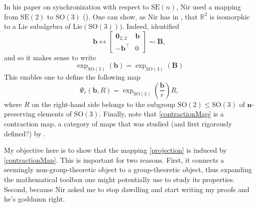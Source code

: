 \documentclass[a4paper,11pt]{scrartcl}
\numberwithin{dummy}{section}
\theoremstyle{plain}
\theoremstyle{plain}
\theoremstyle{plain}
\theoremstyle{plain}
\theoremstyle{nonumberplain}
\newcommand{\F}[1][R]{\mathbb{#1}} %
\newcommand{\Lie}{\mathrm{Lie}}
\newcommand{\SE}{\mathrm{SE}}
\newcommand{\SO}{\mathrm{SO}}
\begin{document}
	In his paper on synchronization with respect to $ \SE(n) $, Nir used a mapping from $ \SE (2) $ to $ \SO(3) $ (\cite{Sharon2018}). One can show, as Nir has in \textcite{Sharon2018}, that $ \F^{2} $ is isomorphic to a Lie subalgebra of $ \Lie (\SO(3))) $. 
	Indeed, \textcite[214]{Sharon2018} identified 
	\begin{equation}
	\label{bIdentif}
	\mathbf{b} 
	\leftrightarrow 
	\left[\begin{matrix}
	\mathbf{0}_{2,2} 	& \mathbf{b} \\
	-\mathbf{b}^{\top} 	& 0
	\end{matrix}\right] \eqqcolon \mathbf{B},
	\end{equation}
	and so it makes sense to write 
	\begin{equation}
	\label{expbDef}
	\exp_{\SO(3)} (\mathbf{b}) = \exp_{\SO(3)} (\mathbf{B})
	\end{equation}
	This enables one to define the following map
	\begin{equation}
	\label{contractionMap}
	\Psi_{r} (\mathbf{b}, R)
	= \exp_{\SO(3)} \left( \frac{\mathbf{b}}{r} \right) R,
	\end{equation}
	where $ R $ on the right-hand side belongs to the subgroup $ \SO(2) \le \SO(3) $ of $ \mathbf{n} $-preserving elements of $ \SO(3) $. Finally, note that \eqref{contractionMap} is a contraction map, a category of maps that was studied (and first rigorously defined?) by \textcite{Dooley1984}.
	
	My objective here is to show that the mapping \eqref{projection} is induced by \eqref{contractionMap}. This is important for two reasons. First, it connects a seemingly non-group-theoretic object to a group-theoretic object, thus expanding the mathematical toolbox one might potentially use to study its properties. Second, because Nir asked me to stop dawdling and start writing my proofs and he's goddamn right.
	
\end{document}
